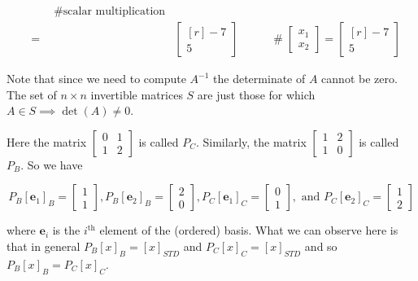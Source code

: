 \documentclass[11pt, oneside]{article}   	%
\begin{document}
\begin{equation*}
\begin{array}{rcll}
     & \qquad \mathrel{\#} \text{scalar multiplication} \\
&=& \begin{bmatrix}[r] -7 \\ 5 \end{bmatrix} 
     & \qquad \mathrel{\#} \begin{bmatrix} x_1 \\ x_2 \end{bmatrix} = \begin{bmatrix}[r] -7 \\ 5 \end{bmatrix} 
\end{array}
\end{equation*}


\bigskip
\noindent
Note that since we need to compute $A^{-1}$ the determinate of $A$ cannot be zero.  The set of
$n \times n$ invertible matrices $S$ are just those for which $ A \in S \implies \det(A) \neq 0$. 

\bigskip
\noindent
Here  the matrix $\begin{bmatrix} 0 & 1 \\ 1 & 2  \end{bmatrix}$ is called $P_C$. Similarly, the matrix $\begin{bmatrix} 1 & 2 \\ 1 & 0  \end{bmatrix}$ is called
$P_B$. So we have

\bigskip
\begin{equation*}
P_B [\mathbf{e}_1]_B = \begin{bmatrix} 1 \\ 1 \end{bmatrix}, P_B[\mathbf{e}_2]_B = \begin{bmatrix} 2 \\ 0 \end{bmatrix},
 P_C[\mathbf{e}_1]_C = \begin{bmatrix} 0 \\ 1 \end{bmatrix}, \text{ and } P_C[\mathbf{e}_2]_C= \begin{bmatrix} 1 \\ 2 \end{bmatrix}
 \end{equation*}
 
 \bigskip
 \noindent
where  $\mathbf{e}_i$ is the $i^{\text{th}}$ element of the (ordered) basis. What we can observe here is that in general  
$P_B[x]_B = [x]_{STD}$  and  $P_C [x]_C = [x]_{STD}$ and so $P_{B}[x]_B =  P_{C}[x]_C$. 
\end{document}
